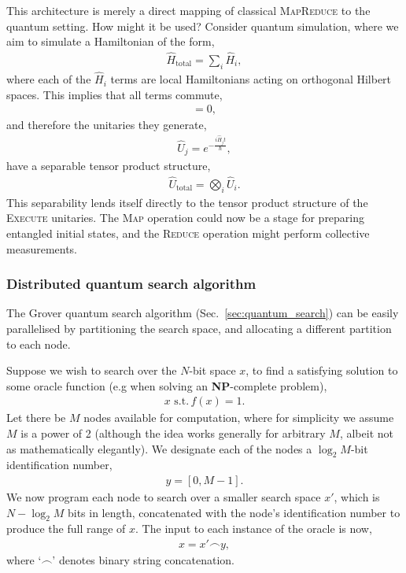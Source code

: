 This architecture is merely a direct mapping of classical \textsc{MapReduce} to the quantum setting. How might it be used? Consider quantum simulation, where we aim to simulate a Hamiltonian of the form,
\begin{align}
\hat{H}_\mathrm{total} = \sum_i \hat{H}_i,	
\end{align}
where each of the $\hat{H}_i$ terms are local Hamiltonians acting on orthogonal Hilbert spaces. This implies that all terms commute,
\begin{align}
[\hat{H}_i,\hat{H}_j]=0,
\end{align}
and therefore the unitaries they generate,
\begin{align}
	\hat{U}_j=e^{-\frac{i\hat{H}_jt}{\hbar}},
\end{align}
have a separable tensor product structure,
\begin{align}
	\hat{U}_\mathrm{total}=\bigotimes_i \hat{U}_i.
\end{align}
This separability lends itself directly to the tensor product structure of the \textsc{Execute} unitaries. The \textsc{Map} operation could now be a stage for preparing entangled initial states, and the \textsc{Reduce} operation might perform collective measurements.


\subsubsection{Distributed quantum search algorithm}

The Grover quantum search algorithm (Sec.~\ref{sec:quantum_search}) can be easily parallelised by partitioning the search space, and allocating a different partition to each node.

Suppose we wish to search over the $N$-bit space $x$, to find a satisfying solution to some oracle function (e.g when solving an \textbf{NP}-complete problem),
\begin{align}
x\,\, \mathrm{s.t.}\, f(x)=1.
\end{align}
Let there be $M$ nodes available for computation, where for simplicity we assume $M$ is a power of 2 (although the idea works generally for arbitrary $M$, albeit not as mathematically elegantly). We designate each of the nodes a $\log_2 M$-bit identification number,
\begin{align}
	y=[0,M-1].
\end{align}
We now program each node to search over a smaller search space $x'$, which is \mbox{$N-\log_2 M$} bits in length, concatenated with the node's identification number to produce the full range of $x$. The input to each instance of the oracle is now,
\begin{align}
x = x'\frown y,
\end{align}
where `$\frown$' denotes binary string concatenation.

